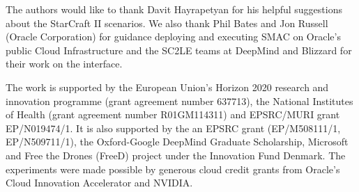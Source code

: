The authors would like to thank Davit Hayrapetyan for his helpful suggestions about the StarCraft II scenarios. We also thank Phil Bates and Jon Russell (Oracle Corporation) for guidance deploying and executing SMAC on Oracle’s public Cloud Infrastructure and the SC2LE teams at DeepMind and Blizzard for their work on the interface.
	
The work is supported by the European Union's Horizon 2020 research and innovation programme (grant agreement number 637713), the National Institutes of Health (grant agreement number R01GM114311) and EPSRC/MURI grant EP/N019474/1. It is also supported by the an EPSRC grant (EP/M508111/1, EP/N509711/1), the Oxford-Google DeepMind Graduate Scholarship, Microsoft and Free the Drones (FreeD) project under the Innovation Fund Denmark.
The experiments were made possible by generous cloud credit grants from Oracle’s Cloud Innovation Accelerator and NVIDIA.
